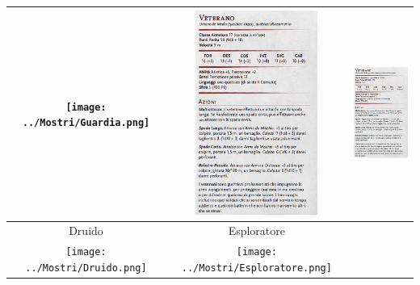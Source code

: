 \begin{tabular}{|c|c|c|}
        \texttt{[image: ../Mostri/Guardia.png]} & \includegraphics[width=4cm, height = 6 cm]{../Mostri/Veterano.png} & \includegraphics[width=4cm, height = 6 cm]{../Mostri/Veterano.png} \\
        \hline
        Druido & Esploratore& \\
        \texttt{[image: ../Mostri/Druido.png]} & \texttt{[image: ../Mostri/Esploratore.png]}&\\
        \hline
    \end{tabular}





